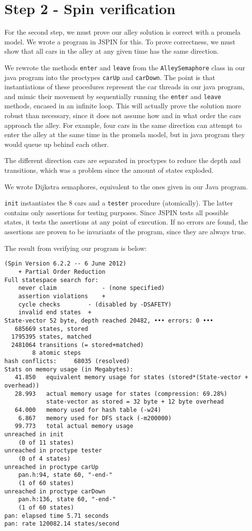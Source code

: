 \section{Step 2 - Spin verification}
For the second step, we must prove our alley solution is correct with a promela model. We wrote a program in JSPIN for this. To prove correctness, we must show that all cars in the alley at any given time has the same direction.

We rewrote the methods \texttt{enter} and \texttt{leave} from the \texttt{AlleySemaphore} class in our java program into the proctypes \texttt{carUp} and \texttt{carDown}. The point is that instantiations of these procedures represent the car threads in our java program, and mimic their movement by sequentially running the \texttt{enter} and \texttt{leave} methods, encased in an infinite loop. This will actually prove the solution more robust than necessary, since it does not assume how and in what order the cars approach the alley. For example, four cars in the same direction can attempt to enter the alley at the same time in the promela model, but in java program they would queue up behind each other.

The different direction cars are separated in proctypes to reduce the depth and transitions, which was a problem since the amount of states exploded.

We wrote Dijkstra semaphores, equivalent to the ones given in our Java program.

\texttt{init} instantiates the 8 cars and a \texttt{tester} procedure (atomically). The latter contains only assertions for testing purposes. Since JSPIN tests all possible states, it tests the assertions at any point of execution. If no errors are found, the assertions are proven to be invariants of the program, since they are always true.

The result from verifying our program is below:
\begin{lstlisting}
(Spin Version 6.2.2 -- 6 June 2012)
	+ Partial Order Reduction
Full statespace search for:
	never claim         	- (none specified)
	assertion violations	+
	cycle checks       	- (disabled by -DSAFETY)
	invalid end states	+
State-vector 52 byte, depth reached 20482, ••• errors: 0 •••
   685669 states, stored
  1795395 states, matched
  2481064 transitions (= stored+matched)
        8 atomic steps
hash conflicts:     68035 (resolved)
Stats on memory usage (in Megabytes):
   41.850	equivalent memory usage for states (stored*(State-vector + overhead))
   28.993	actual memory usage for states (compression: 69.28%)
         	state-vector as stored = 32 byte + 12 byte overhead
   64.000	memory used for hash table (-w24)
    6.867	memory used for DFS stack (-m200000)
   99.773	total actual memory usage
unreached in init
	(0 of 11 states)
unreached in proctype tester
	(0 of 4 states)
unreached in proctype carUp
	pan.h:94, state 60, "-end-"
	(1 of 60 states)
unreached in proctype carDown
	pan.h:136, state 60, "-end-"
	(1 of 60 states)
pan: elapsed time 5.71 seconds
pan: rate 120082.14 states/second
\end{lstlisting}

